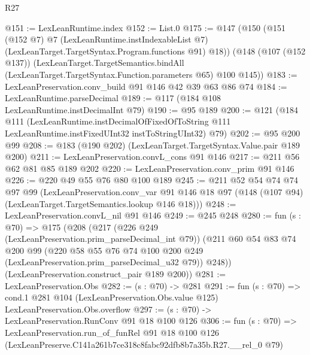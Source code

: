 \begin{lexlean}{R27}
\begin{coremodule}
@151 := LexLeanRuntime.index
@152 := List.{0}
@175 := @147
    (@150
      (@151
        (@152 @7)
        @7
        (LexLeanRuntime.instIndexableList @7)
        (LexLeanTarget.TargetSyntax.Program.functions @91)
        @18))
    (@148
      (@107 (@152 @137))
      (LexLeanTarget.TargetSemantics.bindAll
        (LexLeanTarget.TargetSyntax.Function.parameters @65)
        @100
        @145))
@183 := LexLeanPreservation.conv_build @91 @146 @42 @39 @63 @86 @74
@184 := LexLeanRuntime.parseDecimal
@189 := @117 (@184 @108 LexLeanRuntime.instDecimalInt @79)
@190 := @95 @189
@200 := @121
    (@184
      @111
      (LexLeanRuntime.instDecimalOfFixedOfToString
        @111
        LexLeanRuntime.instFixedUInt32
        instToStringUInt32)
      @79)
@202 := @95 @200 @99
@208 := @183 (@190 @202) (LexLeanTarget.TargetSyntax.Value.pair @189 @200)
@211 := LexLeanPreservation.convL_cons @91 @146
@217 := @211 @56 @62 @81 @85 @189 @202
@220 := LexLeanPreservation.conv_prim @91 @146
@226 := @220 @49 @55 @76 @80 @100 @189
@245 := @211
    @52
    @54
    @74
    @74
    @97
    @99
    (LexLeanPreservation.conv_var
      @91
      @146
      @18
      @97
      (@148 (@107 @94) (LexLeanTarget.TargetSemantics.lookup @146 @18)))
@248 := LexLeanPreservation.convL_nil @91 @146
@249 := @245 @248
@280 := fun (s : @70) =>
  @175
    (@208
      (@217
        (@226 @249 (LexLeanPreservation.prim_parseDecimal_int @79))
        (@211
          @60
          @54
          @83
          @74
          @200
          @99
          (@220 @58 @55 @76 @74 @100 @200 @249 (LexLeanPreservation.prim_parseDecimal_u32 @79))
          @248))
      (LexLeanPreservation.construct_pair @189 @200))
@281 := LexLeanPreservation.Obs
@282 := (s : @70) -> @281
@291 := fun (s : @70) =>
  cond.{1} @281 @104 (LexLeanPreservation.Obs.value @125) LexLeanPreservation.Obs.overflow
@297 := (s : @70) -> LexLeanPreservation.RunConv @91 @18 @100 @126
@306 := fun (s : @70) =>
  LexLeanPreservation.run_of_funRel
    @91
    @18
    @100
    @126
    (LexLeanPreserve.C141a261b7ce318c8fabc92dfb8b7a35b.R27.__rel_0 @79)
\end{coremodule}
\end{lexlean}
